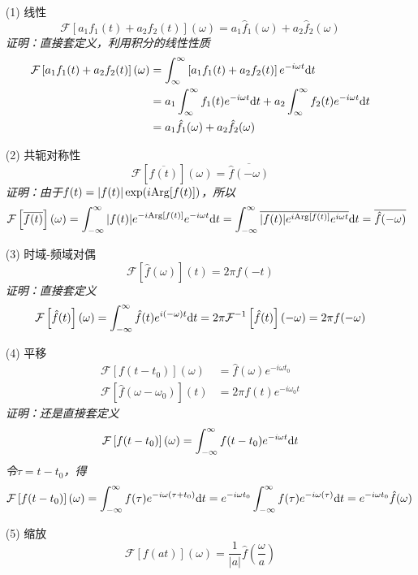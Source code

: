 \documentclass[UTF8]{ctexart}
\newcommand{\trm}[1]{{\rm #1}}
\begin{document}
\begin{itemize}
    \item [(1)] 线性
    \[ \mathcal{F}\left[a_1f_1(t)+a_2f_2(t)\right](\omega) = a_1\hat{f}_1(\omega)+a_2\hat{f}_2(\omega)\]
    \textit{
        证明：直接套定义，利用积分的线性性质
    }
    \begin{align*} 
        \mathcal{F}\left[a_1f_1(t)+a_2f_2(t)\right](\omega) &= \int_{\infty}^{\infty}\left[a_1f_1(t)+a_2f_2(t)\right]e^{-i\omega t}\trm{d}t \\
        &= a_1\int_{\infty}^{\infty}f_1(t)e^{-i\omega t}\trm{d}t + a_2\int_{\infty}^{\infty}f_2(t)e^{-i\omega t}\trm{d}t \\
        &= a_1\hat{f}_1(\omega)+a_2\hat{f}_2(\omega)
    \end{align*}
    \item [(2)] 共轭对称性
    \[ \mathcal{F}\left[\overline{f(t)}\right](\omega) = \overline{\hat{f}(-\omega)}\]
    \textit{
        证明：由于\(f(t)=|f(t)|\exp(i\trm{Arg}[f(t)])\)，所以
    }
    \[\mathcal{F}\left[\overline{f(t)}\right](\omega) = \int_{-\infty}^{\infty}|f(t)|e^{-i\trm{Arg}[f(t)]}e^{-i\omega t}\trm{d}t = \int_{-\infty}^{\infty}\overline{|f(t)|e^{i\trm{Arg}[f(t)]}e^{i\omega t}}\trm{d}t = \overline{\hat{f}(-\omega)}\]
    \item [(3)] 时域-频域对偶
    \[ \mathcal{F}\left[\hat{f}(\omega)\right](t) = 2\pi f(-t)\]
    \textit{
        证明：直接套定义
    }
    \[\mathcal{F}\left[\hat{f}(t)\right](\omega) = \int_{-\infty}^{\infty}\hat{f}(t)e^{i(-\omega)t}\trm{d}t = 2\pi\mathcal{F}^{-1}\left[\hat{f}(t)\right](-\omega) = 2\pi f(-\omega)\]
    \item [(4)] 平移
    \begin{align*} 
        \mathcal{F}\left[f(t-t_0)\right](\omega) &= \hat{f}(\omega)e^{-i\omega t_0} \\
        \mathcal{F}\left[\hat{f}(\omega-\omega_0)\right](t) &= 2\pi f(t)e^{-i\omega_0t}
    \end{align*}
    \textit{
        证明：还是直接套定义
    }
    \[ \mathcal{F}\left[f(t-t_0)\right](\omega) = \int_{-\infty}^{\infty} f(t-t_0)e^{-i\omega t}\trm{d}t\]
    \textit{令\(\tau = t-t_0\)，得}
    \[ \mathcal{F}\left[f(t-t_0)\right](\omega) = \int_{-\infty}^{\infty} f(\tau)e^{-i\omega(\tau+t_0)}\trm{d}t = e^{-i\omega t_0}\int_{-\infty}^{\infty} f(\tau)e^{-i\omega(\tau)}\trm{d}t = e^{-i\omega t_0}\hat{f}(\omega) \]
    \item [(5)] 缩放
    \[ \mathcal{F}\left[f(at)\right](\omega) = \frac{1}{|a|}\hat{f}\left(\frac{\omega}{a}\right) \]

\end{itemize}
\end{document}
